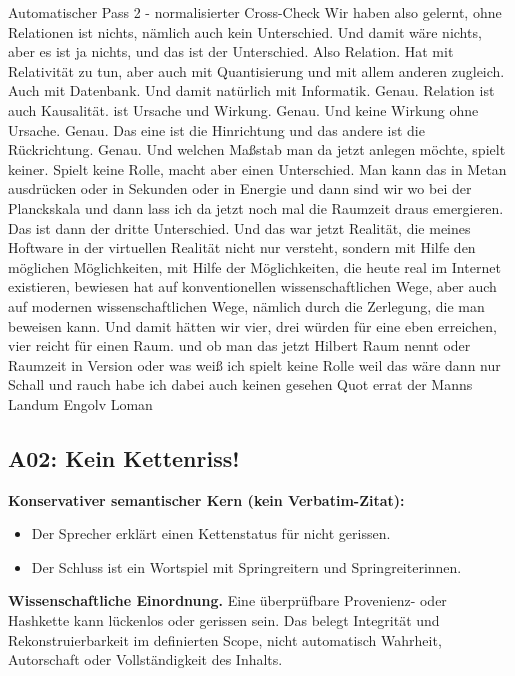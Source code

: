 \documentclass[11pt,a4paper]{article}
\begin{document}
\begin{asrbox}{Automatischer Pass 2 - normalisierter Cross-Check}
Wir haben also gelernt, ohne Relationen ist nichts, nämlich auch kein Unterschied. Und damit wäre nichts, aber es ist ja nichts, und das ist der Unterschied. Also Relation. Hat mit Relativität zu tun, aber auch mit Quantisierung und mit allem anderen zugleich. Auch mit Datenbank. Und damit natürlich mit Informatik. Genau. Relation ist auch Kausalität. ist Ursache und Wirkung. Genau. Und keine Wirkung ohne Ursache. Genau. Das eine ist die Hinrichtung und das andere ist die Rückrichtung. Genau. Und welchen Maßstab man da jetzt anlegen möchte, spielt keiner. Spielt keine Rolle, macht aber einen Unterschied. Man kann das in Metan ausdrücken oder in Sekunden oder in Energie und dann sind wir wo bei der Planckskala und dann lass ich da jetzt noch mal die Raumzeit draus emergieren. Das ist dann der dritte Unterschied. Und das war jetzt Realität, die meines Hoftware in der virtuellen Realität nicht nur versteht, sondern mit Hilfe den möglichen Möglichkeiten, mit Hilfe der Möglichkeiten, die heute real im Internet existieren, bewiesen hat auf konventionellen wissenschaftlichen Wege, aber auch auf modernen wissenschaftlichen Wege, nämlich durch die Zerlegung, die man beweisen kann. Und damit hätten wir vier, drei würden für eine eben erreichen, vier reicht für einen Raum. und ob man das jetzt Hilbert Raum nennt oder Raumzeit in Version oder was weiß ich spielt keine Rolle weil das wäre dann nur Schall und rauch habe ich dabei auch keinen gesehen Quot errat der Manns Landum Engolv Loman
\end{asrbox}


\subsection{A02: Kein Kettenriss!}
\label{sec:a02}
\textbf{Konservativer semantischer Kern (kein Verbatim-Zitat):}
\begin{itemize}
\item Der Sprecher erklärt einen Kettenstatus für nicht gerissen.
\item Der Schluss ist ein Wortspiel mit Springreitern und Springreiterinnen.
\end{itemize}

\textbf{Wissenschaftliche Einordnung.} Eine überprüfbare Provenienz- oder Hashkette kann lückenlos oder gerissen sein. Das belegt Integrität und Rekonstruierbarkeit im definierten Scope, nicht automatisch Wahrheit, Autorschaft oder Vollständigkeit des Inhalts.
\end{document}
